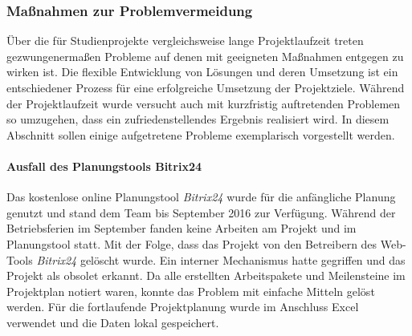 \subsubsection{Maßnahmen zur Problemvermeidung}
Über die für Studienprojekte vergleichsweise lange Projektlaufzeit treten gezwungenermaßen Probleme auf denen mit geeigneten Maßnahmen entgegen zu wirken ist. Die flexible Entwicklung von Lösungen und deren Umsetzung ist ein entschiedener Prozess für eine erfolgreiche Umsetzung der Projektziele. Während der Projektlaufzeit wurde versucht auch mit kurzfristig auftretenden Problemen so umzugehen, dass ein zufriedenstellendes Ergebnis realisiert wird. In diesem Abschnitt sollen einige aufgetretene Probleme exemplarisch vorgestellt werden.

\paragraph{Ausfall des Planungstools Bitrix24} Das kostenlose online Planungstool \textit{Bitrix24} wurde für die anfängliche Planung genutzt und stand dem Team bis September 2016 zur Verfügung. Während der Betriebsferien im September fanden keine Arbeiten am Projekt und im Planungstool statt. Mit der Folge, dass das Projekt von den Betreibern des Web-Tools \textit{Bitrix24} gelöscht wurde. Ein interner Mechanismus hatte gegriffen und das Projekt als obsolet erkannt. Da alle erstellten Arbeitspakete und Meilensteine im Projektplan notiert waren, konnte das Problem mit einfache Mitteln gelöst werden. Für die fortlaufende Projektplanung wurde im Anschluss Excel verwendet und die Daten lokal gespeichert.

